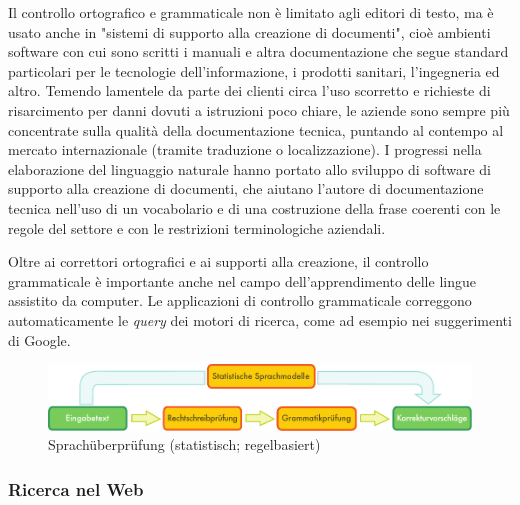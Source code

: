 \documentclass[]{../../metanetpaper}
\begin{document}
\begin{multicols}{2}
Il controllo ortografico e grammaticale non \`{e} limitato agli editori di testo, ma \`{e} usato anche in "sistemi di supporto alla creazione di documenti", cio\`{e} ambienti software con cui sono scritti i manuali e altra documentazione che segue standard particolari per le tecnologie dell'informazione, i prodotti sanitari, l'ingegneria ed altro. Temendo lamentele da parte dei clienti circa l'uso scorretto e richieste di risarcimento per danni dovuti a istruzioni poco chiare, le aziende sono sempre pi\`{u} concentrate sulla qualit\`{a} della documentazione tecnica, puntando al contempo al mercato internazionale (tramite traduzione o localizzazione). I progressi nella elaborazione del linguaggio naturale hanno portato allo sviluppo di software di supporto alla creazione di documenti, che aiutano l'autore di documentazione tecnica nell'uso di un vocabolario e di una costruzione della frase coerenti con le regole del settore e con le restrizioni terminologiche aziendali.





Oltre ai correttori ortografici e ai supporti alla creazione, il controllo grammaticale \`{e} importante anche nel campo dell'apprendimento delle lingue assistito da computer. Le applicazioni di controllo grammaticale correggono automaticamente le \emph{query} dei motori di ricerca, come ad esempio nei suggerimenti di Google.



\begin{figure}[htb]
  \center
  \includegraphics[width=\textwidth]{../_media/german/language_checking}
  \caption{Sprachüberprüfung (statistisch; regelbasiert)}
  \label{fig:langcheckingaarch_de}
\end{figure}



\subsubsection{Ricerca nel Web}


\end{multicols}
\end{document}
